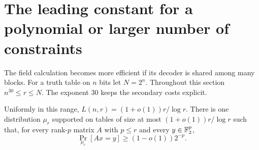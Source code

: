 \section{The leading constant for a polynomial or larger number of constraints}
The field calculation becomes more efficient if its decoder is shared among many blocks. For a truth table on $n$ bits let $N=2^n$. Throughout this section $n^{30}\le r\le N$. The exponent $30$ keeps the secondary costs explicit.

\begin{theorem}\label{th:sparse-sharp}
Uniformly in this range, $L(n,r)=(1+o(1))r/\log r$. There is one distribution $\mu_r$ supported on tables of size at most $(1+o(1))r/\log r$ such that, for every rank-$p$ matrix $A$ with $p\le r$ and every $y\in\mathbb F_2^p$,
\[
                         \Pr_{\mu_r}[Ax=y]\ge(1-o(1))2^{-p}.
\]
\end{theorem}
